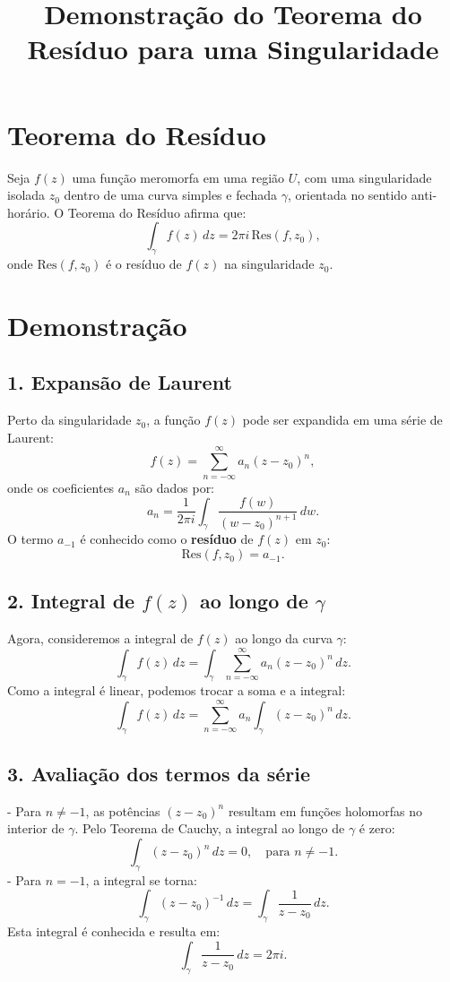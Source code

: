 \documentclass[a4paper,12pt]{article}
\title{Demonstração do Teorema do Resíduo para uma Singularidade}
\author{}
\date{}
\begin{document}
\maketitle

\section*{Teorema do Resíduo}

Seja $f(z)$ uma função meromorfa em uma região $U$, com uma singularidade isolada $z_0$ dentro de uma curva simples e fechada $\gamma$, orientada no sentido anti-horário. O Teorema do Resíduo afirma que:
\[
\int_{\gamma} f(z) \, dz = 2\pi i \, \text{Res}(f, z_0),
\]
onde $\text{Res}(f, z_0)$ é o resíduo de $f(z)$ na singularidade $z_0$.

\section*{Demonstração}

\subsection*{1. Expansão de Laurent}
Perto da singularidade $z_0$, a função $f(z)$ pode ser expandida em uma série de Laurent:
\[
f(z) = \sum_{n=-\infty}^\infty a_n (z - z_0)^n,
\]
onde os coeficientes $a_n$ são dados por:
\[
a_n = \frac{1}{2\pi i} \int_{\gamma} \frac{f(w)}{(w - z_0)^{n+1}} \, dw.
\]
O termo $a_{-1}$ é conhecido como o \textbf{resíduo} de $f(z)$ em $z_0$:
\[
\text{Res}(f, z_0) = a_{-1}.
\]

\subsection*{2. Integral de $f(z)$ ao longo de $\gamma$}
Agora, consideremos a integral de $f(z)$ ao longo da curva $\gamma$:
\[
\int_{\gamma} f(z) \, dz = \int_{\gamma} \sum_{n=-\infty}^\infty a_n (z - z_0)^n \, dz.
\]
Como a integral é linear, podemos trocar a soma e a integral:
\[
\int_{\gamma} f(z) \, dz = \sum_{n=-\infty}^\infty a_n \int_{\gamma} (z - z_0)^n \, dz.
\]

\subsection*{3. Avaliação dos termos da série}
- Para $n \neq -1$, as potências $(z - z_0)^n$ resultam em funções holomorfas no interior de $\gamma$. Pelo Teorema de Cauchy, a integral ao longo de $\gamma$ é zero:
\[
\int_{\gamma} (z - z_0)^n \, dz = 0, \quad \text{para } n \neq -1.
\]
- Para $n = -1$, a integral se torna:
\[
\int_{\gamma} (z - z_0)^{-1} \, dz = \int_{\gamma} \frac{1}{z - z_0} \, dz.
\]
Esta integral é conhecida e resulta em:
\[
\int_{\gamma} \frac{1}{z - z_0} \, dz = 2\pi i.
\]
\end{document}
